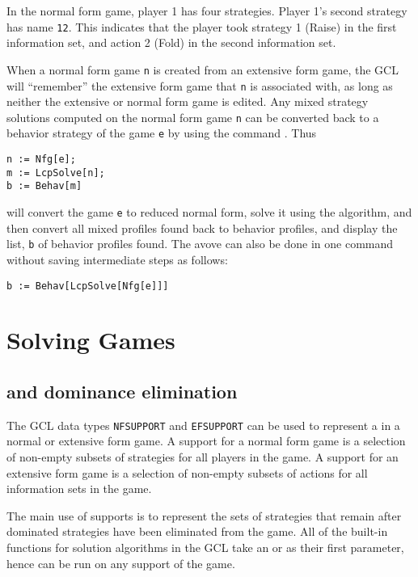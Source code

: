In the normal form game, player 1 has four strategies.  Player 1's
second strategy has name \verb+12+.  This indicates that the player
took strategy 1 (Raise) in the first information set, and action 2
(Fold) in the second information set.  

When a normal form game \verb+n+ is created from an extensive form
game, the GCL will ``remember'' the extensive form game that \verb+n+
is associated with, as long as neither the extensive or normal form
game is edited.  Any mixed strategy solutions computed on the normal
form game \verb+n+ can be converted back to a behavior strategy of the
game \verb+e+ by using the command .  Thus

\begin{verbatim}
n := Nfg[e];
m := LcpSolve[n];
b := Behav[m]
\end{verbatim}

\noindent
will convert the game \verb+e+ to reduced normal form, solve it using
the  algorithm, and then convert all mixed profiles found back
to behavior profiles, and display the list, \verb+b+ of behavior
profiles found. The avove can also be done in one command without saving
intermediate steps as follows:  
  
\begin{verbatim}
b := Behav[LcpSolve[Nfg[e]]]
\end{verbatim}

\chapter{Solving Games}

\section{ and dominance elimination}

The GCL data types \verb+NFSUPPORT+ and \verb+EFSUPPORT+ can be used
to represent a  in a normal or extensive form game.  A
support for a normal form game is a selection of non-empty subsets of
strategies for all players in the game.  A support for an extensive
form game is a selection of non-empty subsets of actions for all
information sets in the game.

The main use of supports is to represent the sets of strategies that
remain after dominated strategies have been eliminated from the game.
All of the built-in functions for solution algorithms in the GCL take
an  or  as their first parameter,
hence can be run on any support of the game.

